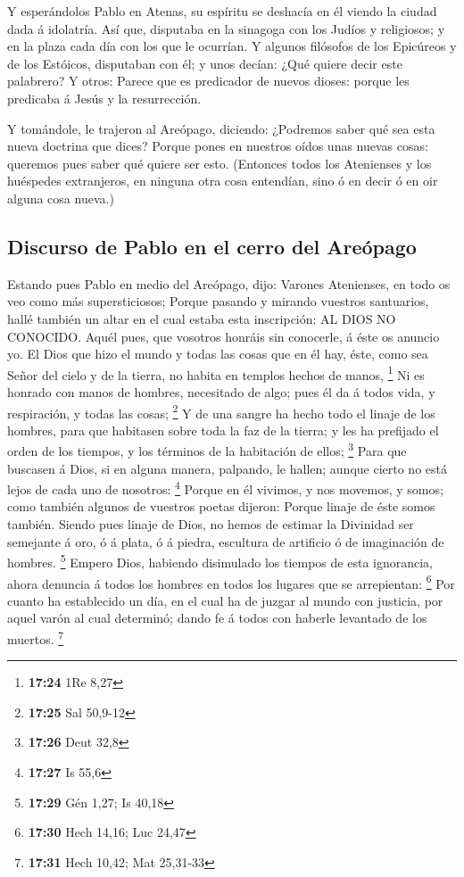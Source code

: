  Y esperándolos Pablo en Atenas, su espíritu se deshacía
en él viendo la ciudad dada á idolatría.  Así que,
disputaba en la sinagoga con los Judíos y religiosos; y en la plaza cada
día con los que le ocurrían.  Y algunos filósofos de los
Epicúreos y de los Estóicos, disputaban con él; y unos decían: ¿Qué
quiere decir este palabrero? Y otros: Parece que es predicador de nuevos
dioses: porque les predicaba á Jesús y la resurrección.

 Y tomándole, le trajeron al Areópago, diciendo:
¿Podremos saber qué sea esta nueva doctrina que dices? 
Porque pones en nuestros oídos unas nuevas cosas: queremos pues saber
qué quiere ser esto.  (Entonces todos los Atenienses y
los huéspedes extranjeros, en ninguna otra cosa entendían, sino ó en
decir ó en oir alguna cosa nueva.)

\hypertarget{discurso-de-pablo-en-el-cerro-del-areuxf3pago}{%
\subsection{Discurso de Pablo en el cerro del
Areópago}\label{discurso-de-pablo-en-el-cerro-del-areuxf3pago}}

 Estando pues Pablo en medio del Areópago, dijo: Varones
Atenienses, en todo os veo como más supersticiosos; 
Porque pasando y mirando vuestros santuarios, hallé también un altar en
el cual estaba esta inscripción: AL DIOS NO CONOCIDO. Aquél pues, que
vosotros honráis sin conocerle, á éste os anuncio yo.  El
Dios que hizo el mundo y todas las cosas que en él hay, éste, como sea
Señor del cielo y de la tierra, no habita en templos hechos de manos,
\footnote{\textbf{17:24} 1Re 8,27}  Ni es honrado con
manos de hombres, necesitado de algo; pues él da á todos vida, y
respiración, y todas las cosas; \footnote{\textbf{17:25} Sal 50,9-12}
 Y de una sangre ha hecho todo el linaje de los hombres,
para que habitasen sobre toda la faz de la tierra; y les ha prefijado el
orden de los tiempos, y los términos de la habitación de ellos;
\footnote{\textbf{17:26} Deut 32,8}  Para que buscasen á
Dios, si en alguna manera, palpando, le hallen; aunque cierto no está
lejos de cada uno de nosotros: \footnote{\textbf{17:27} Is 55,6}
 Porque en él vivimos, y nos movemos, y somos; como
también algunos de vuestros poetas dijeron: Porque linaje de éste somos
también.  Siendo pues linaje de Dios, no hemos de estimar
la Divinidad ser semejante á oro, ó á plata, ó á piedra, escultura de
artificio ó de imaginación de hombres. \footnote{\textbf{17:29} Gén
  1,27; Is 40,18}  Empero Dios, habiendo disimulado los
tiempos de esta ignorancia, ahora denuncia á todos los hombres en todos
los lugares que se arrepientan: \footnote{\textbf{17:30} Hech 14,16; Luc
  24,47}  Por cuanto ha establecido un día, en el cual ha
de juzgar al mundo con justicia, por aquel varón al cual determinó;
dando fe á todos con haberle levantado de los muertos. \footnote{\textbf{17:31}
  Hech 10,42; Mat 25,31-33}

